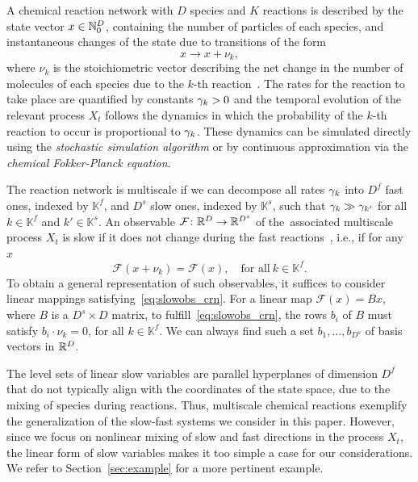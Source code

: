 \documentclass{article}
\newcommand{\obs}{\mathcal{F}} %
\newcommand{\K}{\mathbb{K}} %
\begin{document}
\begin{exa}

A chemical reaction network with $D$ species and $K$ reactions is described by the state vector $x\in\mathbb{N}_0^D$, containing the number of particles of each species, and instantaneous changes of the state due to transitions of the form
\begin{equation*}
    x\to x+\nu_k,
\end{equation*}
where $\nu_k$ is the stoichiometric vector describing the net change in the number of molecules of each species due to the $k$-th reaction~\cite{erban_stochastic_2019,winkelmann_stochastic_2020}. The rates for the reaction to take place are quantified by constants $\gamma_k>0$ and the temporal evolution of the relevant process $X_t$ follows the dynamics in which the probability of the $k$-th reaction to occur is proportional to $\gamma_k$. These dynamics can be simulated directly using the \emph{stochastic simulation algorithm} or by continuous approximation via the \emph{chemical Fokker-Planck equation}. 

The reaction network is multiscale if we can decompose all rates $\gamma_k$ into $D^f$ fast ones, indexed by $\K^f$, and $D^s$ slow ones, indexed by $\K^s$, such that $\gamma_k\gg\gamma_{k'}$ for all $k\in\K^f$ and $k'\in\K^s$. An observable $\obs\from\R^D\to\R^{D^s}$ of the~associated multiscale process $X_t$ is slow if it does not change during the fast reactions~\cite{e_nested_2007}, i.e., if for any~$x$
\begin{equation}\label{eq:slowobs_crn}
    \obs(x+\nu_k) = \obs(x),\quad\text{for all}\ k\in\K^f.
\end{equation}
To obtain a general representation of such observables, it suffices to consider linear mappings satisfying~\eqref{eq:slowobs_crn}. For a linear map $\obs(x)=Bx$, where $B$ is a $D^s\times D$ matrix, to fulfill~\eqref{eq:slowobs_crn}, the rows $b_i$ of $B$ must satisfy $b_i\cdot\nu_k=0$, for all $k\in\K^f$. We can always find such a set $b_1,\dotsc,b_{D^s}$ of basis vectors in $\mathbb{R}^D$.

The level sets of linear slow variables are parallel hyperplanes of dimension $D^f$ that do not typically align with the coordinates of the state space, due to the mixing of species during reactions. Thus, multiscale chemical reactions exemplify the generalization of the slow-fast systems we consider in this paper. However, since we focus on nonlinear mixing of slow and fast directions in the process $X_t$, the linear form of slow variables makes it too simple a case for our considerations. We refer to Section~\ref{sec:example} for a more pertinent example.
\end{exa}
\end{document}
